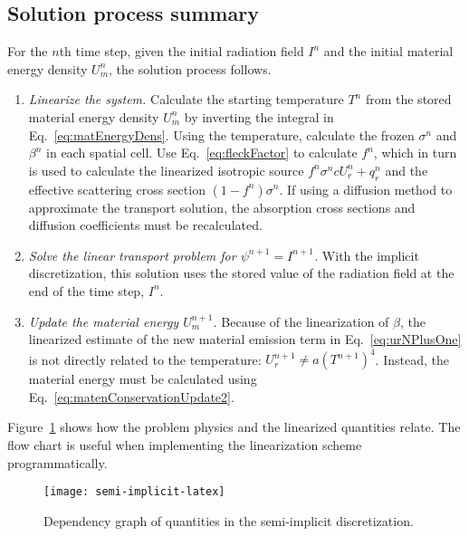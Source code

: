 \subsection{Solution process summary}
For the $n$th time step, given the initial radiation field $I^{n}$ and the
initial material energy density $U_m^n$, the solution process follows.
\begin{enumerate}
  \item \emph{Linearize the system.} Calculate the starting temperature $T^n$
    from the stored material energy density $U_m^n$ by inverting the integral in
    Eq.~\eqref{eq:matEnergyDens}. Using the temperature,
    calculate
    the frozen $\sigma^n$ and $\beta^n$ in each spatial cell. Use
    Eq.~\eqref{eq:fleckFactor} to calculate $f^n$, which in turn is used to
    calculate the linearized isotropic source $f^n \sigma^n c U_r^n + q_r^n$
    and the effective scattering cross section $\left(1 - f^n\right) \sigma^n$.
    If using a diffusion method to approximate the transport solution, the
    absorption cross sections and diffusion coefficients must be recalculated.

  \item \emph{Solve the linear transport problem for $\psi^{n+1}=I^{n+1}$.} With the
    implicit discretization, this solution uses the stored value of the radiation
    field at the end of the time step, $I^n$.
    
  \item \emph{Update the material energy $U_m^{n+1}$.}
    Because of the linearization of
    $\beta$, the linearized estimate of the new material emission term in
    Eq.~\eqref{eq:urNPlusOne} is not directly related to the temperature:
    $U_r^{n+1} \ne a (T^{n+1})^4$. Instead, the material energy must be calculated
    using Eq.~\eqref{eq:matenConservationUpdate2}.
\end{enumerate}

Figure~\ref{fig:semiImplicitFlowchart} shows how the problem physics and the
linearized quantities relate. The flow chart is useful when
implementing the linearization scheme programmatically. 

\begin{figure}[htbp]
  \centering
  \texttt{[image: semi-implicit-latex]}
  \caption{Dependency graph of quantities in the semi-implicit discretization.}
  \label{fig:semiImplicitFlowchart}
\end{figure}


